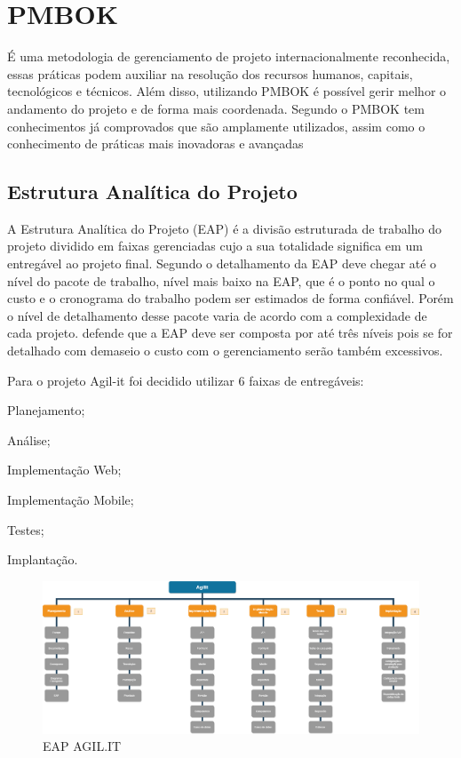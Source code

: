 {\section{PMBOK}

{É uma metodologia de gerenciamento de projeto internacionalmente reconhecida, essas práticas podem auxiliar na resolução dos recursos humanos, capitais, tecnológicos e técnicos. Além disso, utilizando PMBOK é possível gerir melhor o andamento do projeto e de forma mais coordenada. Segundo \cite{PMG2018} o PMBOK tem conhecimentos já comprovados que são amplamente utilizados, assim como o conhecimento de práticas mais inovadoras e avançadas}

\subsection{Estrutura Analítica do Projeto}


{A Estrutura Analítica do Projeto (EAP) é a divisão estruturada de trabalho do projeto dividido em faixas gerenciadas cujo a sua totalidade significa em um entregável ao projeto final.
Segundo \cite{PMI2018} o detalhamento da EAP deve chegar até o nível do pacote de trabalho, nível mais baixo na EAP, que é o ponto no qual o custo e o cronograma do trabalho podem ser estimados de forma confiável. Porém o nível de detalhamento desse pacote varia de acordo com a complexidade de cada projeto. \cite{kerzner2017} defende que a EAP deve ser composta por até três níveis pois se for detalhado com demaseio o custo com o gerenciamento serão também excessivos.}

Para o projeto Agil-it foi decidido utilizar 6 faixas de entregáveis:

\begin{subalineas}
	\item {Planejamento};
	\item {Análise};
	\item {Implementação Web};
	\item {Implementação Mobile};
	\item {Testes};
	\item {Implantação}.
\end{subalineas}

\newpage
\begin{landscape}
\begin{figure}[htb]
	\caption{\label{EAP}EAP AGIL.IT}
	\begin{center}
		\includegraphics[scale=0.38]{./Figuras/EAP.png}
	\end{center}
\end{figure}
\end{landscape}

}
